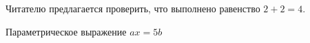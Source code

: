 \documentclass[a4paper, 12pt]{article}
\begin{document}
    Читателю предлагается проверить, что выполнено равенство $2 + 2 = 4$. %

    Параметрическое выражение $ax = 5b$ %
\end{document}
